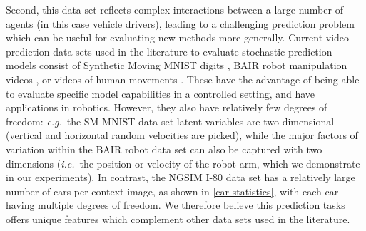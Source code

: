 \documentclass{article}
\begin{document}
Second, this data set reflects complex interactions between a large number of agents (in this case vehicle drivers), leading to a challenging prediction problem which can be useful for evaluating new methods more generally.
Current video prediction data sets used in the literature to evaluate stochastic prediction models consist of Synthetic Moving MNIST digits \citep{Denton2018}, BAIR robot manipulation videos \citep{Ebert17}, or videos of human movements \citep{Denton2018, Babaeizadeh2018}.
These have the advantage of being able to evaluate specific model capabilities in a controlled setting, and have applications in robotics.
However, they also have relatively few degrees of freedom: \emph{e.g.}\ the SM-MNIST data set latent variables are two-dimensional (vertical and horizontal random velocities are picked), while the major factors of variation within the BAIR robot data set can also be captured with two dimensions (\emph{i.e.}\ the position or velocity of the robot arm, which we demonstrate in our experiments).
In contrast, the NGSIM I-80 data set has a relatively large number of cars per context image, as shown in \cref{car-statistics}, with each car having multiple degrees of freedom.
We therefore believe this prediction tasks offers unique features which complement other data sets used in the literature.
\end{document}
